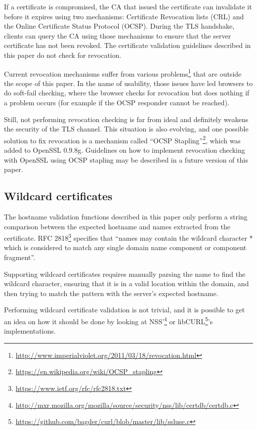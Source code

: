 \documentclass{article}
\begin{document}
If a certificate is compromised, the CA that issued the certificate can
invalidate it before it expires using two mechanisms: Certificate Revocation
lists (CRL) and the Online Certificate Status Protocol (OCSP). During the TLS
handshake, clients can query the CA using those mechanisms to ensure that the
server certificate has not been revoked. The certificate validation guidelines
described in this paper do not check for revocation. 

Current revocation mechanisms suffer from various
problems\footnote{\url{http://www.imperialviolet.org/2011/03/18/revocation.html}} 
that are outside the scope of this paper. In the name of usability, those
issues have led browsers to do soft-fail checking, where the browser checks 
for revocation but does nothing if a problem occurs (for example if the
OCSP responder cannot be reached).

Still, not performing revocation checking is far from ideal and definitely
weakens the security of the TLS channel. This situation is also evolving, and
one possible solution to fix revocation is a mechanism called ``OCSP
Stapling''\footnote{\url{https://en.wikipedia.org/wiki/OCSP_stapling}}, which
was added to OpenSSL 0.9.8g. Guidelines on how to implement revocation
checking with OpenSSL using OCSP stapling may be described in a future version
of this paper.


\subsection{Wildcard certificates}

The hostname validation functions described in this paper only perform a
string comparison between the expected hostname and names extracted from the
certificate. RFC 2818\footnote{\url{https://www.ietf.org/rfc/rfc2818.txt}}
specifies that ``names may contain the wildcard character * which is considered
to match any single domain name component or component fragment''.

Supporting wildcard certificates requires manually parsing the name to find
the wildcard character, ensuring that it is in a valid location within the
domain, and then trying to match the pattern with the server's expected hostname.

Performing wildcard certificate validation is not trivial, and it is possible
to get an idea on how it should be done by looking at NSS'\footnote{\url{http://mxr.mozilla.org/mozilla/source/security/nss/lib/certdb/certdb.c}} 
or libCURL\footnote{\url{https://github.com/bagder/curl/blob/master/lib/ssluse.c}}'s implementations.
\end{document}
